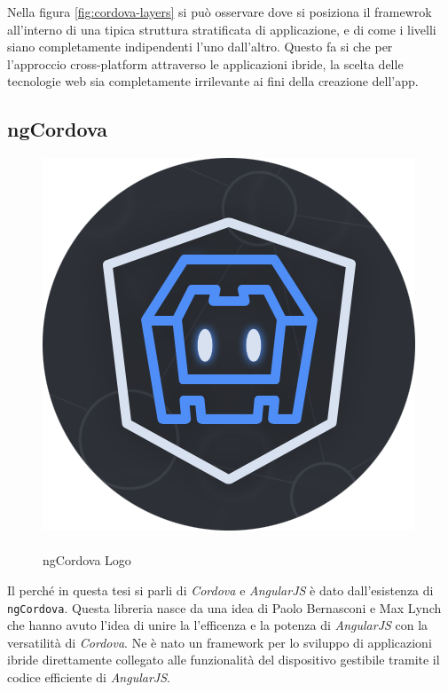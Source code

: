 Nella figura \ref{fig:cordova-layers} si può osservare dove si posiziona il framewrok all'interno di una tipica struttura stratificata di applicazione, e di come i livelli siano completamente indipendenti l'uno dall'altro. Questo fa si che per l'approccio cross-platform attraverso le applicazioni ibride, la scelta delle tecnologie web sia completamente irrilevante ai fini della creazione dell'app.

\subsection{ngCordova}
\label{sec:ngCordova}
\begin{figure}
  \vspace{-65pt}
  \begin{center}
    \includegraphics[scale=0.35]{Figures/ngcordova-logo.png}
  \end{center}
  \vspace{-10pt}
  \caption{\\ngCordova Logo}
  \label{fig:ngCordova}
  \vspace{0pt}
\end{figure}

Il perché in questa tesi si parli di \emph{Cordova} e \emph{AngularJS} è dato dall'esistenza di \texttt{ngCordova}. Questa libreria nasce da una idea di Paolo Bernasconi e Max Lynch che hanno avuto l'idea di unire la l'efficenza e la potenza di \emph{AngularJS} con la versatilità di \emph{Cordova}. Ne è nato un framework per lo sviluppo di applicazioni ibride direttamente collegato alle funzionalità del dispositivo gestibile tramite il codice efficiente di \emph{AngularJS}.\\

